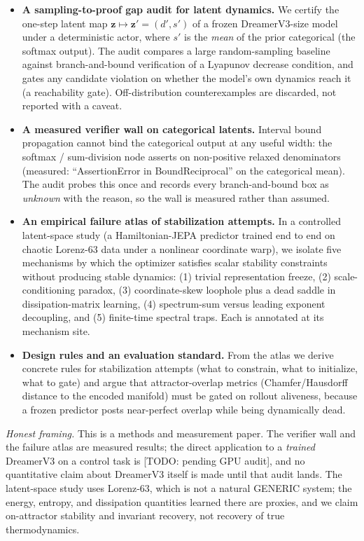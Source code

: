 \documentclass[journal]{IEEEtran}
\newcommand{\zdyn}{\boldsymbol{z}}
\newcommand{\deter}{d}
\newcommand{\stoch}{s}
\begin{document}
\begin{itemize}
\item \textbf{A sampling-to-proof gap audit for latent dynamics.} We certify
the one-step latent map $\zdyn \mapsto \zdyn' = (\deter', \stoch')$ of a
frozen DreamerV3-size model under a deterministic actor, where
$\stoch'$ is the \emph{mean} of the prior categorical (the softmax output).
The audit compares a large random-sampling baseline against
branch-and-bound verification of a Lyapunov decrease condition, and gates any
candidate violation on whether the model's own dynamics reach it
(a reachability gate). Off-distribution counterexamples are discarded, not
reported with a caveat.

\item \textbf{A measured verifier wall on categorical latents.} Interval
bound propagation cannot bind the categorical output at any useful width: the
softmax / sum-division node asserts on non-positive relaxed denominators
(measured: ``AssertionError in BoundReciprocal'' on the categorical mean).
The audit probes this once and records every branch-and-bound box as
\emph{unknown} with the reason, so the wall is measured rather than assumed.

\item \textbf{An empirical failure atlas of stabilization attempts.} In a
controlled latent-space study (a Hamiltonian-JEPA predictor trained end to
end on chaotic Lorenz-63 data under a nonlinear coordinate warp), we isolate
five mechanisms by which the optimizer satisfies scalar stability constraints
without producing stable dynamics: (1) trivial representation freeze,
(2) scale-conditioning paradox, (3) coordinate-skew loophole plus a dead
saddle in dissipation-matrix learning, (4) spectrum-sum versus leading
exponent decoupling, and (5) finite-time spectral traps. Each is annotated at
its mechanism site.

\item \textbf{Design rules and an evaluation standard.} From the atlas we
derive concrete rules for stabilization attempts (what to constrain, what to
initialize, what to gate) and argue that attractor-overlap metrics
(Chamfer/Hausdorff distance to the encoded manifold) must be gated on rollout
aliveness, because a frozen predictor posts near-perfect overlap while being
dynamically dead.
\end{itemize}

\emph{Honest framing.} This is a methods and measurement paper. The verifier
wall and the failure atlas are measured results; the direct application to a
\emph{trained} DreamerV3 on a control task is [TODO: pending GPU audit], and
no quantitative claim about DreamerV3 itself is made until that audit lands.
The latent-space study uses Lorenz-63, which is not a natural GENERIC system;
the energy, entropy, and dissipation quantities learned there are proxies, and
we claim on-attractor stability and invariant recovery, not recovery of true
thermodynamics.
\end{document}
